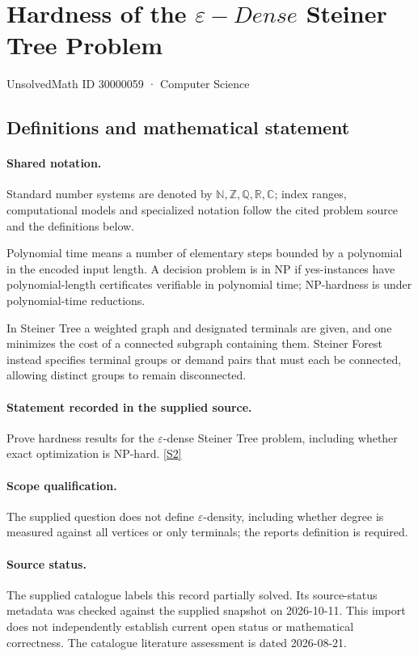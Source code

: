 \documentclass[11pt]{article}
\newcommand{\sref}[2]{\hyperlink{source:#1:#2}{[S#2]}}
\begin{document}
\setcounter{section}{30000058}
\section{Hardness of the $\varepsilon-Dense$ Steiner Tree Problem}\label{30000059}
{\small\sffamily UnsolvedMath ID 30000059 · Computer Science}
\subsection{Definitions and mathematical statement}

\paragraph{Shared notation.}Standard number systems are denoted by $\mathbb N,\mathbb Z,\mathbb Q,\mathbb R,\mathbb C$; index ranges, computational models and specialized notation follow the cited problem source and the definitions below.


Polynomial time means a number of elementary steps bounded by a polynomial in the encoded input length. A decision problem is in $\mathrm{NP}$ if yes-instances have polynomial-length certificates verifiable in polynomial time; NP-hardness is under polynomial-time reductions.

In Steiner Tree a weighted graph and designated terminals are given, and one minimizes the cost of a connected subgraph containing them. Steiner Forest instead specifies terminal groups or demand pairs that must each be connected, allowing distinct groups to remain disconnected.
\paragraph{Statement recorded in the supplied source.}
Prove hardness results for the $\varepsilon$-dense Steiner Tree problem, including whether exact optimization is NP-hard. \sref{30000059}{2}
\paragraph{Scope qualification.}
The supplied question does not define $\varepsilon$-density, including whether degree is measured against all vertices or only terminals; the report\textquotesingle s definition is required.
\paragraph{Source status.}
The supplied catalogue labels this record partially solved. Its source-status metadata was checked against the supplied snapshot on 2026-10-11. This import does not independently establish current open status or mathematical correctness. The catalogue literature assessment is dated 2026-08-21.
\end{document}
